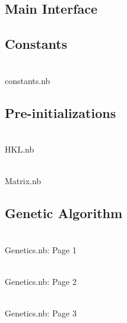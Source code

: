 \begin{figure}[h]
\subsection{Main Interface}
\end{figure}


\begin{figure}[h]
\subsection{Constants}
\\constants.nb
\end{figure}

\begin{figure}[h]
\subsection{Pre-initializations}
\begin{minipage}{.5\linewidth}
\\HKL.nb
\end{minipage}\begin{minipage}{.5\linewidth}\\Matrix.nb\end{minipage}
\end{figure}

\begin{figure}[p]
\subsection{Genetic Algorithm}
\\Genetics.nb: Page 1
\end{figure}
\begin{figure}[p]
\\Genetics.nb: Page 2
\end{figure}
\begin{figure}[ht]
\\Genetics.nb: Page 3
\end{figure}


